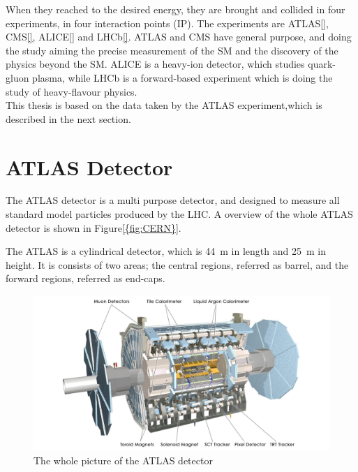 When they reached to the desired energy, they are brought and collided in four experiments, in four interaction points (IP). 
The experiments are ATLAS\ref{}, CMS\ref{}, ALICE\ref{} and LHCb\ref{}. ATLAS and CMS have general purpose, and doing the study aiming the precise measurement of the SM and the discovery of the physics beyond the SM. ALICE is a heavy-ion detector, which studies quark-gluon plasma, while LHCb is a forward-based experiment which is doing the study of heavy-flavour physics. \\
This thesis is based on the data taken by the ATLAS experiment,which is described in the next section.

\section{ATLAS Detector}
\label{sec:detector}
The ATLAS detector is a multi purpose detector, and designed to measure all standard model particles produced by the LHC.
A overview of the whole ATLAS detector is shown in Figure\ref{{fig:CERN}}.

The ATLAS is a cylindrical detector, which is 44~m in length and 25~m in height. It is consists of two areas; the central regions, referred as barrel, and the forward regions, referred as end-caps.

\begin{figure}[tbp]
\begin{center}
 \includegraphics[width=1.0\textwidth,keepaspectratio]{figures/detector/ATLAS}
\caption{
The whole picture of the ATLAS detector
}
\label{fig:ATLAS}
\end{center}
\end{figure}

